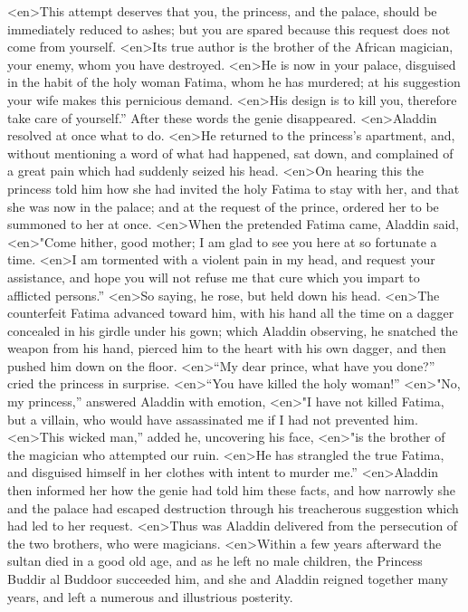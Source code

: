 <en>This attempt deserves that you, the princess, and the palace, should be immediately reduced to ashes; but you are spared because this request does not come from yourself.
<en>Its true author is the brother of the African magician, your enemy, whom you have destroyed.
<en>He is now in your palace, disguised in the habit of the holy woman Fatima, whom he has murdered; at his suggestion your wife makes this pernicious demand.
<en>His design is to kill you, therefore take care of yourself.” After these words the genie disappeared.
<en>Aladdin resolved at once what to do.
<en>He returned to the princess’s apartment, and, without mentioning a word of what had happened, sat down, and complained of a great pain which had suddenly seized his head.
<en>On hearing this the princess told him how she had invited the holy Fatima to stay with her, and that she was now in the palace; and at the request of the prince, ordered her to be summoned to her at once.
<en>When the pretended Fatima came, Aladdin said,
<en>"Come hither, good mother; I am glad to see you here at so fortunate a time.
<en>I am tormented with a violent pain in my head, and request your assistance, and hope you will not refuse me that cure which you impart to afflicted persons.”
<en>So saying, he rose, but held down his head.
<en>The counterfeit Fatima advanced toward him, with his hand all the time on a dagger concealed in his girdle under his gown; which Aladdin observing, he snatched the weapon from his hand, pierced him to the heart with his own dagger, and then pushed him down on the floor.
<en>“My dear prince, what have you done?” cried the princess in surprise.
<en>“You have killed the holy woman!”
<en>"No, my princess,” answered Aladdin with emotion,
<en>"I have not killed Fatima, but a villain, who would have assassinated me if I had not prevented him.
<en>This wicked man,” added he, uncovering his face,
<en>"is the brother of the magician who attempted our ruin.
<en>He has strangled the true Fatima, and disguised himself in her clothes with intent to murder me.”
<en>Aladdin then informed her how the genie had told him these facts, and how narrowly she and the palace had escaped destruction through his treacherous suggestion which had led to her request.
<en>Thus was Aladdin delivered from the persecution of the two brothers, who were magicians.
<en>Within a few years afterward the sultan died in a good old age, and as he left no male children, the Princess Buddir al Buddoor succeeded him, and she and Aladdin reigned together many years, and left a numerous and illustrious posterity.
